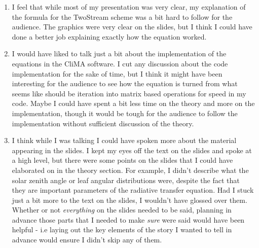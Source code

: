 \documentclass{article}
\begin{document}
    \begin{enumerate}[(1)]
    
        \item I feel that while most of my presentation was very clear, my
              explanation of the formula for the TwoStream scheme was a bit hard
              to follow for the audience. The graphics were very clear on the
              slides, but I think I could have done a better job explaining
              exactly how the equation worked.
        \item I would have liked to talk just a bit about the implementation of
              the equations in the CliMA software. I cut any discussion about
              the code implementation for the sake of time, but I think it might
              have been interesting for the audience to see how the equation is
              turned from what seems like should be iteration into matrix based
              operations for speed in my code. Maybe I could have spent a bit
              less time on the theory and more on the implementation, though it
              would be tough for the audience to follow the implementation
              without sufficient discussion of the theory.
        \item I think while I was talking I could have spoken more about the 
              material appearing in the slides. I kept my eyes off the text on
              the slides and spoke at a high level, but there were some points
              on the slides that I could have elaborated on in the theory
              section. For example, I didn't describe what the solar zenith
              angle or leaf angular distributions were, despite the fact that
              they are important parameters of the radiative transfer equation.
              Had I stuck just a bit more to the text on the slides, I wouldn't
              have glossed over them. Whether or not \emph{everything} on the 
              slides needed to be said, planning in advance those parts that I
              needed to make \emph{sure} were said would have been helpful - 
              i.e laying out the key elements of the story I wanted to tell in 
              advance would ensure I didn't skip any of them.

    \end{enumerate}
\end{document}
